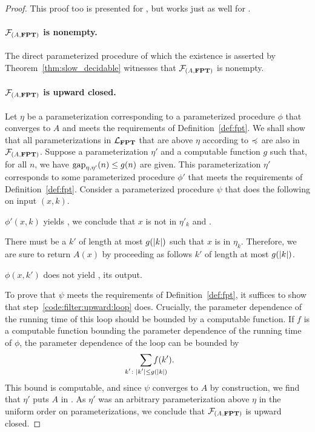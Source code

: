 \begin{proof}
  This proof too is presented for , but works just as well for .

  \paragraph{$\mathcal{F}_{(A, \textnormal{\textbf{FPT}})}$ is nonempty.}
  The direct parameterized procedure of which the existence is asserted by Theorem~\ref{thm:slow_decidable} witnesses that $\mathcal{F}_{(A, \textnormal{\textbf{FPT}})}$ is nonempty.

  \paragraph{$\mathcal{F}_{(A, \textnormal{\textbf{FPT}})}$ is upward closed.}
  Let $\eta$ be a parameterization corresponding to a parameterized procedure $\phi$ that converges to $A$ and meets the requirements of Definition~\ref{def:fpt}.
  We shall show that all parameterizations in $\mathcal{L}_{\textnormal{\textbf{FPT}}}$ that are above $\eta$ according to $\preccurlyeq$ are also in $\mathcal{F}_{(A, \textnormal{\textbf{FPT}})}$.
  Suppose a parameterization $\eta'$ and a computable function $g$ such that, for all $n$, we have $\operatorname{gap}_{\eta, \eta'}(n) \le g(n)$ are given.
  This parameterization $\eta'$ corresponds to some parameterized procedure $\phi'$ that meets the requirements of Definition~\ref{def:fpt}.
  Consider a parameterized procedure $\psi$ that does the following on input $(x, k)$.
  \begin{codelisting}
  \item
     $\phi'(x, k)$ yields , we conclude that $x$ is not in $\eta'_k$ and  .
  \item\label{code:filter:upward:loop}
    There must be a $k'$ of length at most $g(\length{k})$ such that $x$ is in $\eta_k$.
    Therefore, we are sure to return $A(x)$ by proceeding as follows  $k'$ of length at most $g(\length{k})$.
    \begin{codelisting}
    \item {} $\phi(x, k')$ does not yield ,  its output.
    \end{codelisting}
  \end{codelisting}

  To prove that $\psi$ meets the requirements of Definition~\ref{def:fpt}, it suffices to show that step~\ref{code:filter:upward:loop} does.
  Crucially, the parameter dependence of the running time of this loop should be bounded by a computable function.
  If $f$ is a computable function bounding the parameter dependence of the running time of $\phi$, the parameter dependence of the loop can be bounded by
  \begin{equation*}
    \sum_{\mathclap{k'\colon \length{k'} \le g(\length{k})}} f(k').
  \end{equation*}
  This bound is computable, and since $\psi$ converges to $A$ by construction, we find that $\eta'$ puts $A$ in .
  As $\eta'$ was an arbitrary parameterization above $\eta$ in the uniform order on parameterizations, we conclude that $\mathcal{F}_{(A, \textnormal{\textbf{FPT}})}$ is upward closed.


\end{proof}
